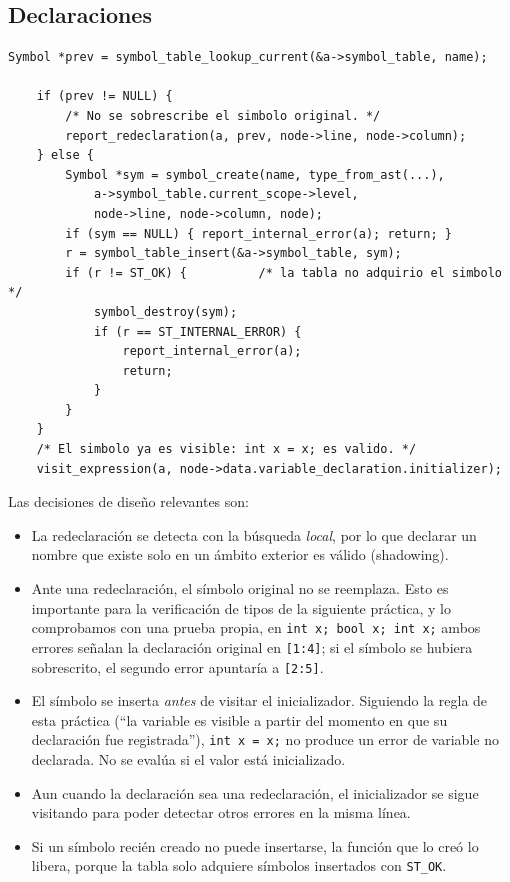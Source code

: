 \documentclass[12pt,letterpaper]{article}
\begin{document}
\subsection*{Declaraciones}

\begin{lstlisting}[style=modernc, caption={\texttt{visit\_variable\_declaration} (resumida).}]
    Symbol *prev = symbol_table_lookup_current(&a->symbol_table, name);

    if (prev != NULL) {
        /* No se sobrescribe el simbolo original. */
        report_redeclaration(a, prev, node->line, node->column);
    } else {
        Symbol *sym = symbol_create(name, type_from_ast(...),
            a->symbol_table.current_scope->level,
            node->line, node->column, node);
        if (sym == NULL) { report_internal_error(a); return; }
        r = symbol_table_insert(&a->symbol_table, sym);
        if (r != ST_OK) {          /* la tabla no adquirio el simbolo */
            symbol_destroy(sym);
            if (r == ST_INTERNAL_ERROR) {
                report_internal_error(a);
                return;
            }
        }
    }
    /* El simbolo ya es visible: int x = x; es valido. */
    visit_expression(a, node->data.variable_declaration.initializer);
\end{lstlisting}

\bigskip

Las decisiones de diseño relevantes son:

\begin{itemize}
\item La redeclaración se detecta con la búsqueda \emph{local}, por lo que declarar un nombre que existe solo
  en un ámbito exterior es válido (shadowing).

\item Ante una redeclaración, el símbolo original no se reemplaza. Esto es importante para la verificación de
  tipos de la siguiente práctica, y lo comprobamos con una prueba propia, en
  \texttt{int x; bool x; int x;} ambos errores señalan la declaración original en \texttt{[1:4]}; si el
  símbolo se hubiera sobrescrito, el segundo error apuntaría a \texttt{[2:5]}.

\item El símbolo se inserta \emph{antes} de visitar el inicializador. Siguiendo la regla de esta práctica
  (``la variable es visible a partir del momento en que su declaración fue registrada''), \texttt{int x = x;}
  no produce un error de variable no declarada. No se evalúa si el valor está inicializado.

\item Aun cuando la declaración sea una redeclaración, el inicializador se sigue visitando para poder
  detectar otros errores en la misma línea.

\item Si un símbolo recién creado no puede insertarse, la función que lo creó lo libera, porque la tabla solo
  adquiere símbolos insertados con \texttt{ST\_OK}.
\end{itemize}
\end{document}
